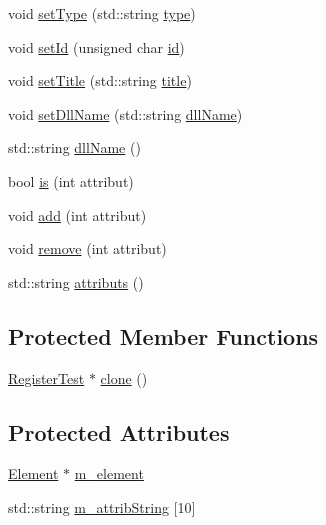 \begin{DoxyCompactItemize}
\item 
void \hyperlink{classObject_aae534cc9d982bcb9b99fd505f2e103a5}{set\+Type} (std\+::string \hyperlink{classObject_a84f99f70f144a83e1582d1d0f84e4e62}{type})
\item 
void \hyperlink{classObject_a398fe08cba594a0ce6891d59fe4f159f}{set\+Id} (unsigned char \hyperlink{classObject_af99145335cc61ff6e2798ea17db009d2}{id})
\item 
void \hyperlink{classObject_a89557dbbad5bcaa02652f5d7fa35d20f}{set\+Title} (std\+::string \hyperlink{classObject_a73a0f1a41828fdd8303dd662446fb6c3}{title})
\item 
void \hyperlink{classObject_a870c5af919958c2136623b2d7816d123}{set\+Dll\+Name} (std\+::string \hyperlink{classObject_a2e3947f2870094c332d7454117f3ec63}{dll\+Name})
\item 
std\+::string \hyperlink{classObject_a2e3947f2870094c332d7454117f3ec63}{dll\+Name} ()
\item 
bool \hyperlink{classAttrib_a704f26af560909ad22065083bb7d4c34}{is} (int attribut)
\item 
void \hyperlink{classAttrib_a235f773af19c900264a190b00a3b4ad7}{add} (int attribut)
\item 
void \hyperlink{classAttrib_a7d4ef7e32d93cb287792b87b857e79f3}{remove} (int attribut)
\item 
std\+::string \hyperlink{classAttrib_aee7bbf16b144887f196e1341b24f8a26}{attributs} ()
\end{DoxyCompactItemize}
\subsection*{Protected Member Functions}
\begin{DoxyCompactItemize}
\item 
\hyperlink{classRegisterTest}{Register\+Test} $\ast$ \hyperlink{classRegisterTest_a05c7318198562df874c8d7ab5d0e9f89}{clone} ()
\end{DoxyCompactItemize}
\subsection*{Protected Attributes}
\begin{DoxyCompactItemize}
\item 
\hyperlink{classElement}{Element} $\ast$ \hyperlink{classProcessus_aa9d24d53c3e52f36786cabb5d8e296e7}{m\+\_\+element}
\item 
std\+::string \hyperlink{classAttrib_a3414521d7a82476e874b25a5407b5e63}{m\+\_\+attrib\+String} \mbox{[}10\mbox{]}
\end{DoxyCompactItemize}
